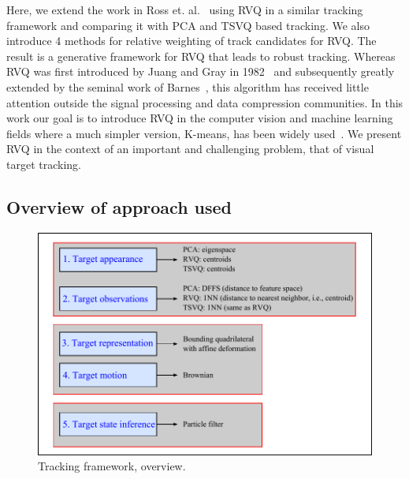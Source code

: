 \begin{Body}
Here, we extend the work in Ross et. al.~\cite{2008_JNL_subspaceTRK_Ross} using RVQ in a similar tracking framework and comparing it with PCA and TSVQ based tracking.  We also introduce 4 methods for relative weighting of track candidates for RVQ.  The result is a generative framework for RVQ that leads to robust tracking.  Whereas RVQ was first introduced by Juang and Gray in 1982~\cite{1982_CNF_SpeechRVQ_JuangGray} and subsequently greatly extended by the seminal work of Barnes~\cite{1991_CNF_DesignPerformanceRVQ_Frost,1992_JNL_RVQ_Barnes,1992_CNF_ImageCodingRVQ_Kossentini,1993_sigmaTrees_Barnes,1993_JNL_RVQDSC_Barnes,1995_JNL_OptimalityRVQ_Kossentini,1996_CNF_VQclassification_Barnes,1996_JNL_AdvancesRVQ_Barnes,2002_JNL_SigmaTrees_Barnes,2004_CNF_DSSAdataMining_Barnes,2007_JNL_Katrina_Barnes,2007_JNL_IDDM_Barnes}, this algorithm has received little attention outside the signal processing and data compression communities.  In this work our goal is to introduce RVQ in the computer vision and machine learning fields where a much simpler version, K-means, has been widely used~\cite{2008_JNL_PRML_Wu}.  We present RVQ in the context of an important and challenging problem, that of visual target tracking.

\subsection{Overview of approach used}
								\begin{figure}[t]
								\centering
								\includegraphics[width=1.0\textwidth]{thesis/PhD_experimentalOverview.pdf}
								\caption{Tracking framework, overview.}
								\label{fig:overview}
								\end{figure}


\end{Body}

